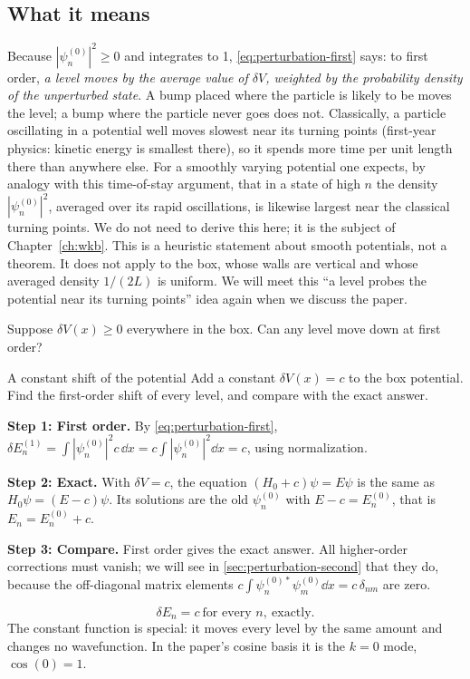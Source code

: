 \subsection{What it means}

Because $|\psi_n^{(0)}|^2\ge 0$ and integrates to 1, \cref{eq:perturbation-first} says: to first order, \emph{a level moves by the average value of $\delta V$, weighted by the probability density of the unperturbed state}. A bump placed where the particle is likely to be moves the level; a bump where the particle never goes does not. Classically, a particle oscillating in a potential well moves slowest near its turning points (first-year physics: kinetic energy is smallest there), so it spends more time per unit length there than anywhere else. For a smoothly varying potential one expects, by analogy with this time-of-stay argument, that in a state of high $n$ the density $|\psi_n^{(0)}|^2$, averaged over its rapid oscillations, is likewise largest near the classical turning points. We do not need to derive this here; it is the subject of Chapter~\ref{ch:wkb}. This is a heuristic statement about smooth potentials, not a theorem. It does not apply to the box, whose walls are vertical and whose averaged density $1/(2L)$ is uniform. We will meet this ``a level probes the potential near its turning points'' idea again when we discuss the paper.

\begin{checkpoint}
Suppose $\delta V(x)\ge0$ everywhere in the box. Can any level move down at first order?
\end{checkpoint}

\begin{sample}{A constant shift of the potential}
Add a constant $\delta V(x)=c$ to the box potential. Find the first-order shift of every level, and compare with the exact answer.

\textbf{Step 1: First order.} By \cref{eq:perturbation-first},
$\delta E_n^{(1)}=\int|\psi_n^{(0)}|^2c\,\dd x=c\int|\psi_n^{(0)}|^2\dd x=c$, using normalization.

\textbf{Step 2: Exact.} With $\delta V=c$, the equation $(H_0+c)\psi=E\psi$ is the same as $H_0\psi=(E-c)\psi$. Its solutions are the old $\psi_n^{(0)}$ with $E-c=E_n^{(0)}$, that is $E_n=E_n^{(0)}+c$.

\textbf{Step 3: Compare.} First order gives the exact answer. All higher-order corrections must vanish; we will see in \cref{sec:perturbation-second} that they do, because the off-diagonal matrix elements $c\int\psi_n^{(0)*}\psi_m^{(0)}\dd x=c\,\delta_{nm}$ are zero.

\[
\boxed{\delta E_n=c\ \text{for every }n,\ \text{exactly}.}
\]
The constant function is special: it moves every level by the same amount and changes no wavefunction. In the paper's cosine basis it is the $k=0$ mode, $\cos(0)=1$.
\end{sample}

